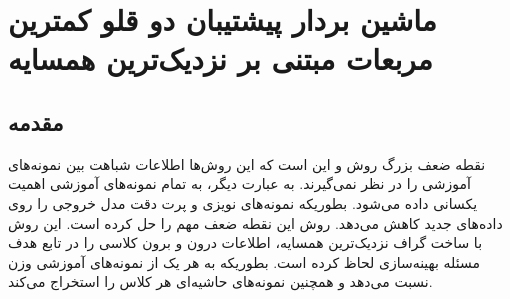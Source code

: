 
\chapter{ماشین بردار پیشتیبان دو قلو کمترین مربعات مبتنی بر نزدیک‌ترین همسایه }\label{ch:3}
\section{مقدمه}\label{sec:3:1}
نقطه ضعف بزرگ روش  و  این است که این روش‌ها اطلاعات شباهت  بین نمونه‌های آموزشی را در نظر نمی‌گیرند. به عبارت دیگر، به تمام نمونه‌های آموزشی اهمیت یکسانی داده می‌شود. بطوریکه نمونه‌های نویزی و پرت دقت مدل خروجی را روی داده‌های جدید کاهش می‌دهد. روش  این نقطه ضعف مهم را حل کرده است. این روش با ساخت گراف نزدیک‌ترین همسایه، اطلاعات درون و برون کلاسی را در تابع هدف مسئله بهینه‌سازی لحاظ کرده است. بطوریکه به هر یک از نمونه‌های آموزشی وزن نسبت می‌دهد و همچنین نمونه‌های حاشیه‌ای هر کلاس را استخراج می‌کند.